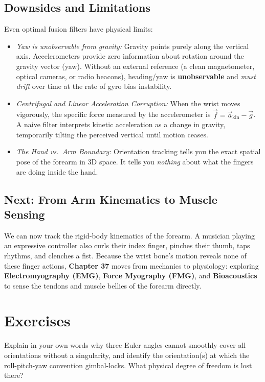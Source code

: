\subsection{Downsides and Limitations}
Even optimal fusion filters have physical limits:
\begin{itemize}
  \item \emph{Yaw is unobservable from gravity:} Gravity points purely along the vertical axis. Accelerometers provide zero information about rotation around the gravity vector (yaw). Without an external reference (a clean magnetometer, optical cameras, or radio beacons), heading/yaw is \textbf{unobservable} and \emph{must drift} over time at the rate of gyro bias instability.
  \item \emph{Centrifugal and Linear Acceleration Corruption:} When the wrist moves vigorously, the specific force measured by the accelerometer is $\vec{f} = \vec{a}_{\text{kin}} - \vec{g}$. A naive filter interprets kinetic acceleration as a change in gravity, temporarily tilting the perceived vertical until motion ceases.
  \item \emph{The Hand vs.\ Arm Boundary:} Orientation tracking tells you the exact spatial pose of the forearm in 3D space. It tells you \emph{nothing} about what the fingers are doing inside the hand.
\end{itemize}

\subsection{Next: From Arm Kinematics to Muscle Sensing}
We can now track the rigid-body kinematics of the forearm. A musician playing an expressive controller also curls their index finger, pinches their thumb, taps rhythms, and clenches a fist. Because the wrist bone's motion reveals none of these finger actions, \textbf{Chapter 37} moves from mechanics to physiology: exploring \textbf{Electromyography (EMG)}, \textbf{Force Myography (FMG)}, and \textbf{Bioacoustics} to sense the tendons and muscle bellies of the forearm directly.

\section{Exercises}
\label{ch36:exercises}

\begin{exercise}
Explain in your own words why three Euler angles cannot smoothly cover all orientations
without a singularity, and identify the orientation(s) at which the roll-pitch-yaw
convention gimbal-locks. What physical degree of freedom is lost there?
\end{exercise}

